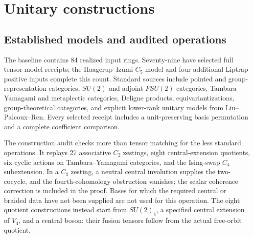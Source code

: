 \section{Unitary constructions}
\subsection{Established models and audited operations}
The baseline contains 84 realized input rings. Seventy-nine have selected
full tensor-model receipts; the Haagerup--Izumi $C_5$ model and four additional
Liptrap-positive inputs complete this count. Standard sources include
pointed and group-representation categories, $SU(2)$ and adjoint $PSU(2)$
categories, Tambara--Yamagami and metaplectic categories, Deligne products,
equivariantizations, group-theoretical categories, and explicit lower-rank
unitary models from Liu--Palcoux--Ren. Every selected receipt includes a
unit-preserving basis permutation and a complete coefficient comparison.

The construction audit checks more than tensor matching for the less standard
operations. It replays 27 associative $C_2$ zestings, eight central-extension
quotients, six cyclic actions on Tambara--Yamagami categories, and the
Ising-swap $C_4$ subextension. In a $C_2$ zesting, a neutral central
involution supplies the two-cocycle, and the fourth-cohomology obstruction
vanishes; the scalar coherence correction is included in the proof. Bases
for which the required central or braided data have not been supplied are
not used for this operation. The eight quotient constructions instead start
from $SU(2)_4$, a specified central extension of $V_4$, and a central boson;
their fusion tensors follow from the actual free-orbit quotient.

